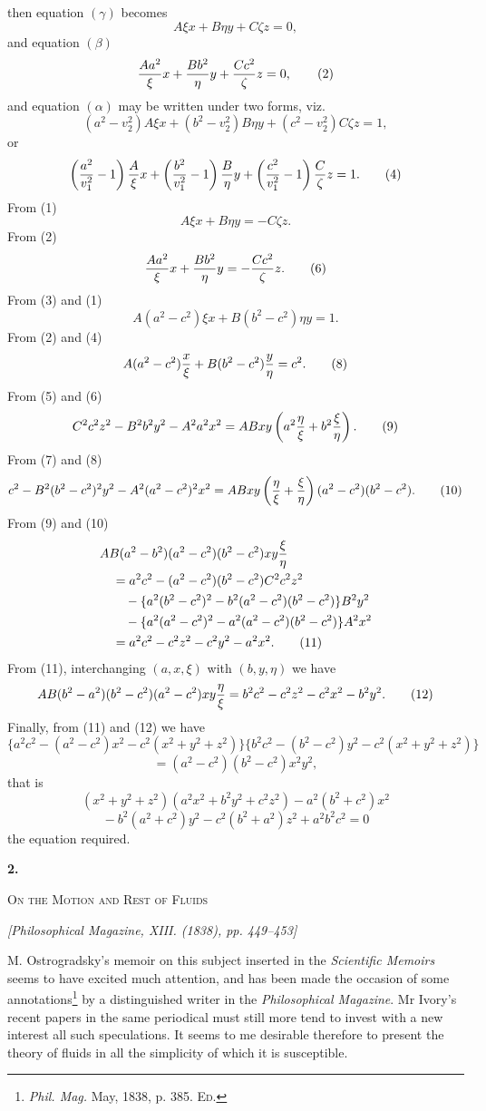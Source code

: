 \documentclass[11pt]{article}
\newcommand{\paperhead}[3]{%
  \clearpage
  \begin{center}
  {\Large\bfseries #1.}\par\vspace{0.85em}
  {\large\scshape #2}\par\vspace{0.6em}
  {\itshape [#3]}\par
  \end{center}\vspace{0.4em}}
\newcommand{\sourcepage}[1]{\marginpar{\scriptsize p.~#1}}
\begin{document}
\sourcepage{27}
then equation $(\gamma)$ becomes
\[
 A\xi x+B\eta y+C\zeta z=0, \tag{1}
\]
and equation $(\beta)$
\[
 {Aa^2\over \xi}x+{Bb^2\over \eta}y+{Cc^2\over \zeta}z=0, \tag{2}
\]
and equation $(\alpha)$ may be written under two forms, viz.
\[
 (a^2-v_2^2)A\xi x+(b^2-v_2^2)B\eta y+(c^2-v_2^2)C\zeta z=1, \tag{3}
\]
or
\[
 \left({a^2\over v_1^2}-1\right){A\over\xi}x
 +\left({b^2\over v_1^2}-1\right){B\over\eta}y
 +\left({c^2\over v_1^2}-1\right){C\over\zeta}z=1. \tag{4}
\]
From (1)
\[
 A\xi x+B\eta y=-C\zeta z. \tag{5}
\]
From (2)
\[
 {Aa^2\over\xi}x+{Bb^2\over\eta}y=-{Cc^2\over\zeta}z. \tag{6}
\]
From (3) and (1)
\[
 A(a^2-c^2)\xi x+B(b^2-c^2)\eta y=1. \tag{7}
\]
From (2) and (4)
\[
 A(a^2-c^2){x\over\xi}+B(b^2-c^2){y\over\eta}=c^2. \tag{8}
\]
From (5) and (6)
\[
 C^2c^2z^2-B^2b^2y^2-A^2a^2x^2
 =ABxy\left(a^2{\eta\over\xi}+b^2{\xi\over\eta}\right). \tag{9}
\]
From (7) and (8)
\[
 c^2-B^2(b^2-c^2)^2y^2-A^2(a^2-c^2)^2x^2
 =ABxy\left({\eta\over\xi}+{\xi\over\eta}\right)(a^2-c^2)(b^2-c^2). \tag{10}
\]
From (9) and (10)
\begin{align*}
 &AB(a^2-b^2)(a^2-c^2)(b^2-c^2)xy{\xi\over\eta} \\
 &\quad= a^2c^2-(a^2-c^2)(b^2-c^2)C^2c^2z^2\\
 &\qquad -\{a^2(b^2-c^2)^2-b^2(a^2-c^2)(b^2-c^2)\}B^2y^2\\
 &\qquad -\{a^2(a^2-c^2)^2-a^2(a^2-c^2)(b^2-c^2)\}A^2x^2\\
 &\quad= a^2c^2-c^2z^2-c^2y^2-a^2x^2. \tag{11}
\end{align*}
From (11), interchanging $(a,x,\xi)$ with $(b,y,\eta)$ we have
\[
 AB(b^2-a^2)(b^2-c^2)(a^2-c^2)xy{\eta\over\xi}
 =b^2c^2-c^2z^2-c^2x^2-b^2y^2. \tag{12}
\]
Finally, from (11) and (12) we have
\[
 \{a^2c^2-(a^2-c^2)x^2-c^2(x^2+y^2+z^2)\}
 \{b^2c^2-(b^2-c^2)y^2-c^2(x^2+y^2+z^2)\}
\]
\[
 =(a^2-c^2)(b^2-c^2)x^2y^2,
\]
that is
\[
 (x^2+y^2+z^2)(a^2x^2+b^2y^2+c^2z^2)-a^2(b^2+c^2)x^2
\]
\[
 {}-b^2(a^2+c^2)y^2-c^2(b^2+a^2)z^2+a^2b^2c^2=0
\]
the equation required.

\paperhead{2}{On the Motion and Rest of Fluids}{Philosophical Magazine, XIII. (1838), pp. 449--453}
\sourcepage{28}
M. Ostrogradsky's memoir on this subject inserted in the \emph{Scientific Memoirs} seems to have excited much attention, and has been made the occasion of some annotations\footnote{\emph{Phil. Mag.} May, 1838, p. 385. \textsc{Ed.}} by a distinguished writer in the \emph{Philosophical Magazine}. Mr Ivory's recent papers in the same periodical must still more tend to invest with a new interest all such speculations. It seems to me desirable therefore to present the theory of fluids in all the simplicity of which it is susceptible.
\end{document}
